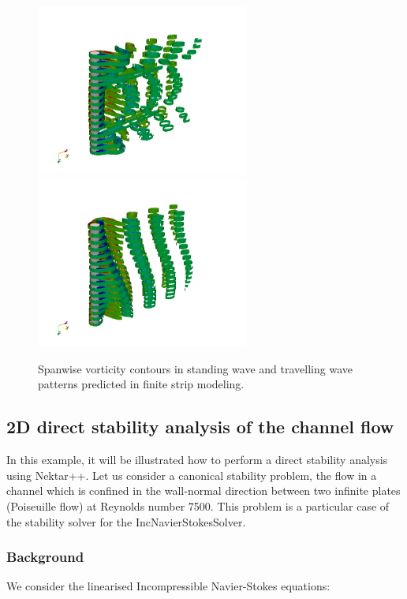 \begin{figure}
\begin{center}
\includegraphics[width=7cm]{img/strip-16-time-100.png}
\includegraphics[width=7cm]{img/strip-16-time-600.png}
\caption{Spanwise vorticity contours in standing wave and travelling wave patterns predicted in finite strip modeling.}
\label{f:incns:finite-strip-modeling}
\end{center}
\end{figure}

 \subsection{2D direct stability analysis of the channel flow}

  In this example, it will be illustrated how to perform a direct stability analysis using Nektar++. Let us consider a canonical stability problem, the flow in a channel which is confined in the wall-normal direction between two infinite plates (Poiseuille flow) at Reynolds number 7500. This problem is a particular case of the stability solver for the IncNavierStokesSolver.

 \subsubsection{Background}

  We consider the linearised Incompressible Navier-Stokes equations:

